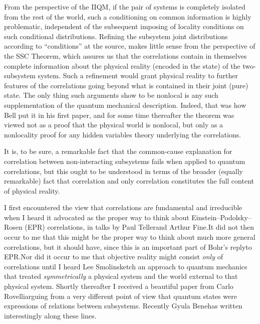 From the perspective of the IIQM, if the pair of systems is completely
isolated from the rest of the world, such a conditioning on common
information is highly problematic, independent of the subsequent
imposing of locality conditions on such conditional distributions.
Refining the subsystem joint distributions according to ``conditions''
at the source, makes little sense from the perspective of the SSC
Theorem, which assures us that the correlations contain in themselves
complete information about the physical reality (encoded in the state)
of the two-subsystem system.  Such a refinement would grant physical
reality to further features of the correlations going beyond what is
contained in their joint (pure) state.  The only thing such arguments
show to be nonlocal is any such supplementation of the quantum
mechanical description.  Indeed, that was how Bell put it in his first
paper, and for some time thereafter the theorem was viewed not as a
proof that the physical world is nonlocal, but only as a nonlocality
proof for any hidden variables theory underlying the correlations.

It is, to be sure, a remarkable fact that the common-cause explanation
for correlation between non-interacting subsystems fails when applied
to quantum correlations, but this ought to be understood in terms of
the broader (equally remarkable) fact that correlation and only
correlation constitutes the full content of physical reality.  

\bigskip{}\nobreak\medskip\nobreak I first encountered the view
that correlations are fundamental and irreducible when I heard it
advocated as the proper way to think about Einstein--Podolsky--Rosen
(EPR) correlations, in talks by Paul Teller\fn and Arthur Fine.\fn It
did not then occur to me that this might be the proper way to think
about much more general correlations, but it should have, since this
is an important part of Bohr's reply\fn to EPR.\fn Nor did it occur to
me that objective reality might consist {\it only\/} of correlations
until I heard Lee Smolin\fn sketch an approach to quantum mechanics
that treated {\it symmetrically\/} a physical system and the world
external to that physical system.  Shortly thereafter I received a
beautiful paper from Carlo Rovelli\fn arguing from a very different
point of view that quantum states were expressions of relations
between subsystems.  Recently Gyula Bene\fn has written interestingly
along these lines.

